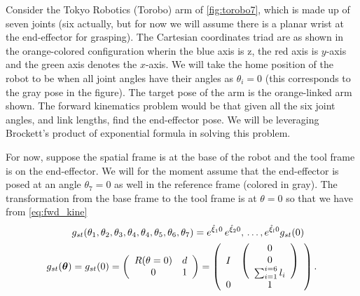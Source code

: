 \begin{example}
	Consider the Tokyo Robotics (Torobo) arm of \autoref{fig:torobo7}, which is made up of seven joints (six actually, but for now we will assume there is a planar wrist at the end-effector for grasping). The Cartesian coordinates triad are as shown in the orange-colored configuration wherin the blue axis is z, the red axis is $y$-axis and the green axis denotes the $x$-axis. We will take the home position of the robot to be when all joint angles have their angles as $\theta_i = 0$ (this corresponds to the gray pose in the figure). The target pose of the arm is the orange-linked arm shown. The forward kinematics problem would be that given all the six joint angles, and link lengths, find the end-effector pose. We will be leveraging Brockett's product of exponential formula in solving this problem.
	
	For now, suppose the spatial frame is at the base of the robot and the tool frame is on the end-effector. We will for the moment assume that the end-effector is posed at an angle $\theta_7= 0$ as well in the reference frame (colored in gray). The transformation from the base frame to the tool frame is at $\theta = 0$ so that we have from \eqref{eq:fwd_kine}
	\begin{subequations}
		\begin{align}
		&g_{st}(\theta_1,\theta_2,\theta_3,\theta_4,\theta_4, \theta_5, \theta_6, \theta_7) =	e^{\hat{\xi}_1 0}\,e^{\hat{\xi}_2 0},  \, \ldots, e^{\hat{\xi}_l 0} g_{st}(0)   \\
		g_{st}(\bm{\theta}) & = g_{st}(0) = \left(\begin{array}{cc}
		{R}(\theta=0) & d \\
		0 & 1
		\end{array} 
		\right) = \left(
		\begin{array}{cc}
		I & \left(\begin{array}{c}
		0 
		\\
		0
		\\
		\sum_{i=1}^{i=6} l_i
		\end{array}\right)  \\
		0 & 1
		\end{array} \right).
		\end{align}
	\end{subequations}
\label{ex:torobo7}
\end{example}

